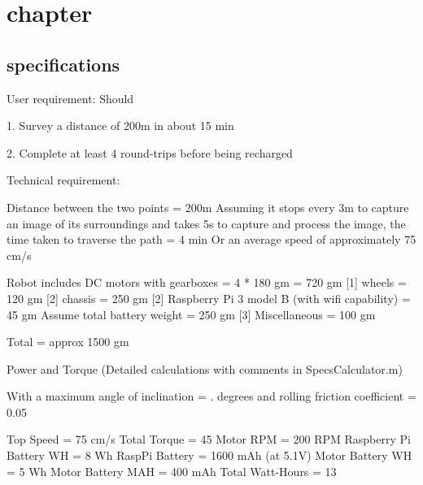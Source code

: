 \documentclass[a4paper,12pt]{article}
\begin{document}
\section{chapter}
{
	\subsection{specifications}
	{
		
		User requirement:\newline
		Should \newline
		
		1. Survey a distance of 200m in about 15 min \newline
		
		2. Complete at least 4 round-trips before being recharged \newline
		
		Technical requirement:\newline
		
		Distance between the two points = 200m \newline
		Assuming it stops every 3m to capture an image of its surroundings and takes 5s to capture and process the image, the time taken to traverse the path = 4 min\newline
		Or an average speed of approximately 75 cm/s\newline
		
		Robot includes DC motors with gearboxes = 4 * 180 gm = 720 gm [1]  wheels = 120 gm [2]
		chassis = 250 gm [2]  
		Raspberry Pi 3 model B (with wifi capability) = 45 gm
		Assume total battery weight = 250 gm [3] 
		Miscellaneous = 100 gm
		
		Total = approx 1500 gm \newline
		
		Power and Torque (Detailed calculations with comments in SpecsCalculator.m) \newline
		
		With a maximum angle of inclination = . degrees and rolling friction coefficient = 0.05
		
		Top Speed = 75 cm/s \newline
		Total Torque =  45   \newline
		Motor RPM =  200 RPM  \newline
		Raspberry Pi Battery WH =  8 Wh \newline
		RaspPi Battery =  1600 mAh (at 5.1V) \newline
		Motor Battery WH = 5 Wh \newline
		Motor Battery MAH =  400 mAh \newline
		Total Watt-Hours =  13 \newline
		}
	}
\end{document}
